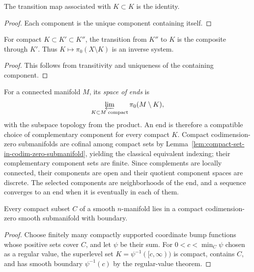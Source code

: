 \begin{lemma}
\label{lem:ends-transition-id}





The transition map associated with $K\subset K$ is the identity.
\end{lemma}
\begin{proof}
\sketch

Each component is the unique component containing itself.
\end{proof}

\begin{lemma}
\label{lem:ends-transition-comp}





For compact $K\subset K'\subset K''$, the transition from $K''$ to
$K$ is the composite through $K'$. Thus $K\mapsto\pi_0(X\setminus K)$
is an inverse system.
\end{lemma}
\begin{proof}
\sketch

This follows from transitivity and uniqueness of the containing
component.
\end{proof}

\begin{definition}
\label{def:space-of-ends}






For a connected manifold $M$, its \emph{space of ends} is
$$\varprojlim_{K\subset M\text{ compact}}\pi_0(M\setminus K),$$
with the subspace topology from the product. An end is therefore a
compatible choice of complementary component for every compact $K$.
Compact codimension-zero submanifolds are cofinal among compact sets by
Lemma~\ref{lem:compact-set-in-codim-zero-submanifold}, yielding the
classical equivalent indexing; their complementary component sets are
finite. Since complements are locally connected, their components are
open and their quotient component spaces are discrete. The selected
components are neighborhoods of the end, and a sequence converges to an
end when it is eventually in each of them.
\end{definition}

\begin{lemma}
\label{lem:compact-set-in-codim-zero-submanifold}
Every compact subset $C$ of a smooth $n$-manifold lies in a compact
codimension-zero smooth submanifold with boundary.
\end{lemma}
\begin{proof}
\sketch
Choose finitely many compactly supported coordinate bump functions whose
positive sets cover $C$, and let $\psi$ be their sum. For
$0<c<\min_C\psi$ chosen as a regular value, the superlevel set
$K=\psi^{-1}([c,\infty))$ is compact, contains $C$, and has smooth
boundary $\psi^{-1}(c)$ by the regular-value theorem.
\end{proof}

